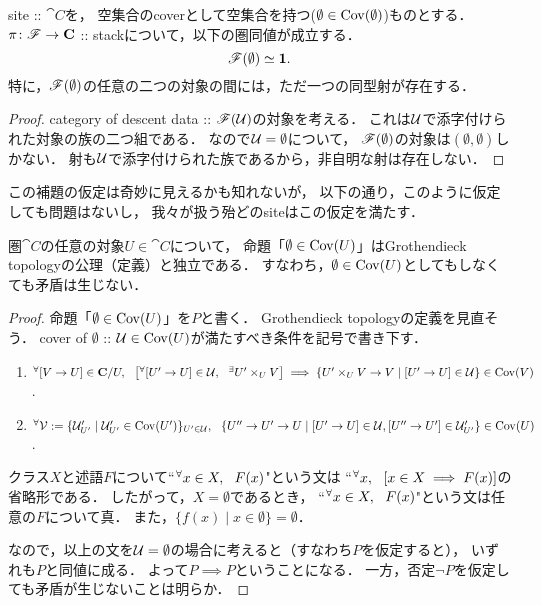 \documentclass[a4paper, dvipdfmx]{jsarticle}
\begin{document}
\begin{Lemma}
    site :: $\cat{C}$を，
    空集合のcoverとして空集合を持つ($\emptyset \in \operatorname{Cov}(\emptyset)$)ものとする．
    $\pi \colon \mathscr{F} \to \mathbf{C}$ :: stackについて，以下の圏同値が成立する．
    \[ \mathscr{F}( \emptyset ) \simeq \mathbf{1}. \]
    特に，$\mathscr{F}(\emptyset)$の任意の二つの対象の間には，ただ一つの同型射が存在する．
\end{Lemma}
\begin{proof}
    category of descent data :: $\mathscr{F}(\mathcal{U})$の対象を考える．
    これは$\mathcal{U}$で添字付けられた対象の族の二つ組である．
    なので$\mathcal{U}=\emptyset$について，
    $\mathscr{F}(\emptyset)$の対象は$(\emptyset, \emptyset)$しかない．
    射も$\mathcal{U}$で添字付けられた族であるから，非自明な射は存在しない．
\end{proof}

この補題の仮定は奇妙に見えるかも知れないが，
以下の通り，このように仮定しても問題はないし，
我々が扱う殆どのsiteはこの仮定を満たす．

\begin{Claim}
    圏$\cat{C}$の任意の対象$U \in \cat{C}$について，
    命題「$\emptyset \in \operatorname{Cov}(U)$」はGrothendieck topologyの公理（定義）と独立である．
    すなわち，$\emptyset \in \operatorname{Cov}(U)$としてもしなくても矛盾は生じない．
\end{Claim}
\begin{proof}
    命題「$\emptyset \in \operatorname{Cov}(U)$」を$P$と書く．
    Grothendieck topologyの定義を見直そう．
    cover of $\emptyset$ :: $\mathcal{U} \in \operatorname{Cov}(U)$が満たすべき条件を記号で書き下す．
    \begin{enumerate}[label=(\alph*)]
        \item
            ${}^{\forall} [V \to U] \in \mathbf{C}/U,~~
            \left[ {}^{\forall} [U' \to U] \in \mathcal{U},~~ {}^{\exists} U' \times_{U} V \right]
            \implies \{ U' \times_{U} V \to V \mid [U' \to U] \in \mathcal{U} \} \in \operatorname{Cov}(V)$.

        \item ${}^{\forall} \mathcal{V}:=\{ \mathcal{U}'_{U'} \mid \mathcal{U}'_{U'} \in \operatorname{Cov}(U')\}_{U' \in \mathcal{U}},~~
                \{ U'' \to U' \to U \mid
                    [U' \to U] \in \mathcal{U}, [U'' \to U'] \in \mathcal{U}'_{U'} \} \in \operatorname{Cov}(U)$.
    \end{enumerate}
    クラス$X$と述語$F$について``${}^{\forall} x \in X,~~ F(x)$"という文は
    ``${}^{\forall} x,~~ \left[x \in X \implies F(x)\right]$の省略形である．
    したがって，$X=\emptyset$であるとき，
    ``${}^{\forall} x \in X,~~ F(x)$"という文は任意の$F$について真．
    また，$\{ f(x) \mid x \in \emptyset \}=\emptyset$．

    なので，以上の文を$\mathcal{U}=\emptyset$の場合に考えると（すなわち$P$を仮定すると），
    いずれも$P$と同値に成る．
    よって$P \implies P$ということになる．
    一方，否定$\lnot P$を仮定しても矛盾が生じないことは明らか．
\end{proof}
\end{document}
